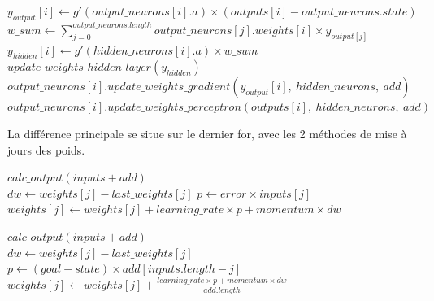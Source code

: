 \documentclass[a4paper,12pt, twoside]{article}
\begin{document}
\begin{algorithmic}

\State $y_{output}[i] \gets g'(output\_neurons[i].a) \times ( outputs[i] - output\_neurons.state )$
\EndFor
\\
\State $w\_sum \gets \sum \limits_{j=0}^{output\_neurons.length} output\_neurons[j].weights[i] \times y_{output[j]}$
\State $y_{hidden}[i] \gets g'(hidden\_neurons[i].a) \times w\_sum$
\EndFor
\State $update\_weights\_hidden\_layer(y_{hidden})$
\\
\State $output\_neurons[i].update\_weights\_gradient(y_{output}[i],\ hidden\_neurons,\ add)$
\State $output\_neurons[i].update\_weights\_perceptron(outputs[i],\ hidden\_neurons,\ add)$
\EndFor
\EndFunction
\State
\end{algorithmic}

La différence principale se situe sur le dernier for, avec les 2 méthodes de mise à jours des poids.
\\[0.7cm]

\begin{algorithmic}

\State $calc\_output(inputs + add)$
\\
\State $dw \gets weights[j] - last\_weights[j]$
\State $p \gets error \times inputs[j]$
\State $weights[j] \gets weights[j] + learning\_rate \times p + momentum \times dw$
\EndFor
\EndFunction
\State
\State
\end{algorithmic}


\begin{algorithmic}

\State $calc\_output(inputs + add)$
\\
\State $dw \gets weights[j] - last\_weights[j]$
\State $p \gets (goal - state ) \times add[inputs.length - j]$
\State $weights[j] \gets weights[j] + \frac{learning\_rate \times p + momentum \times dw}{add.length} $
\EndFor
\EndFunction

\end{algorithmic}
\end{document}

